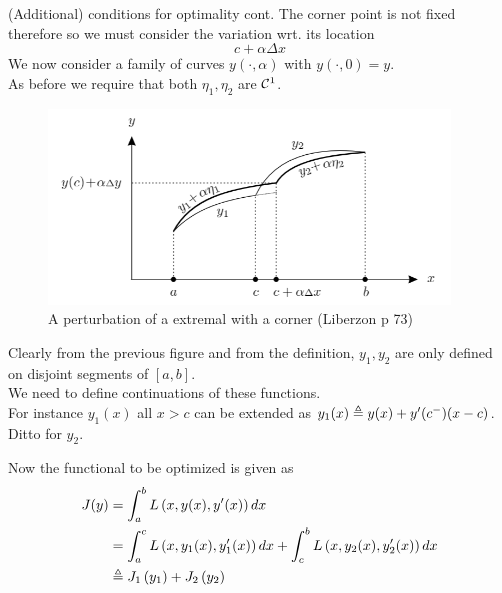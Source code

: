 \documentclass{beamer}
\begin{document}
   \begin{frame}{(Additional) conditions for optimality cont.}
       The corner point is not fixed therefore so we must consider the variation wrt. its location
       \begin{equation*}
           c + \alpha \Delta x
       \end{equation*}
       We now consider a family of curves \(y(\cdot, \alpha)\) with \(y(\cdot,0) = y\).\\ \medskip
       As before we require that both \(\eta_1, \eta_2\) are $\mathcal{C}^1$.
   \end{frame}
    \begin{frame}
        \begin{figure}[!htb]
        	\centering
        	\includegraphics[width=0.95\textwidth]{img/extremalwtcorner.png}
        	\caption{A perturbation of a extremal with a corner (Liberzon p 73)}
        \end{figure}
    \end{frame}
    \begin{frame}
        Clearly from the previous figure and from the definition, \(y_1,y_2\) are only defined on disjoint segments of \(\left[a,b\right]\).\\\medskip
        We need to define continuations of these functions.\\
        For instance $y_1(x)$ all $x > c$ can be extended as $y_1(x) \triangleq y(x) + y'(c^-)(x-c)$. Ditto for $y_2$. \\ \medskip
    \end{frame}
    \begin{frame}
        Now the functional to be optimized is given as
        \begin{equation*}
            \begin{split}
                 J ( y ) &= \int _ { a } ^ { b } L \left( x , y ( x ) , y ^ { \prime } ( x ) \right) d x  \\
                  &= \int _ { a } ^ { c } L \left( x , y _ { 1 } ( x ) , y _ { 1 } ^ { \prime } ( x ) \right) d x + \int _ { c } ^ { b } L \left( x , y _ { 2 } ( x ) , y _ { 2 } ^ { \prime } ( x ) \right) d x \\
                 &\triangleq J _ { 1 } \left( y _ { 1 } \right) + J _ { 2 } \left( y _ { 2 } \right)
            \end{split}
        \end{equation*}
    \end{frame}
\end{document}
